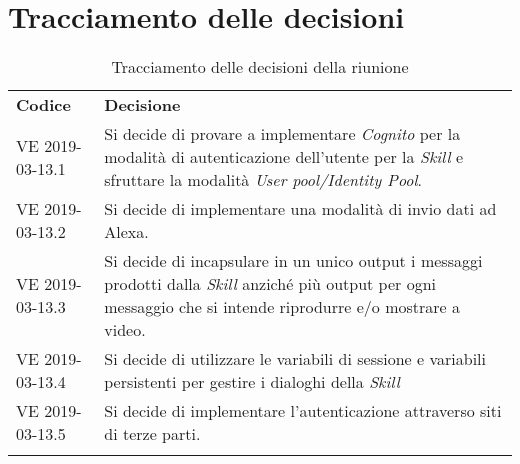 \clearpage
\section{Tracciamento delle decisioni}
\label{sec:tracciamento}
\begin{center}
	\renewcommand{\arraystretch}{1.5}
	\begin{longtable}{  p{2.8cm} p{11.4cm} }
		\rowcolor{tableHeadYellow}
		\textbf{Codice}&\textbf{Decisione}\\
		VE 2019-03-13.1 & Si decide di provare a implementare \textit{Cognito} per la modalità di autenticazione dell'utente per la \textit{Skill} e sfruttare la modalità \textit{User pool/Identity Pool}.\\
		VE 2019-03-13.2 & Si decide di implementare una modalità di invio dati ad Alexa.\\
		VE 2019-03-13.3 & Si decide di incapsulare in un unico output i messaggi prodotti dalla \textit{Skill} anziché più output per ogni messaggio che si intende riprodurre e/o mostrare a video.\\
		VE 2019-03-13.4 & Si decide di utilizzare le variabili di sessione e variabili persistenti per gestire i dialoghi della \textit{Skill}\\
		VE 2019-03-13.5 & Si decide di implementare l'autenticazione attraverso siti di terze parti.\\
		\rowcolor{white}
		\caption{Tracciamento delle decisioni della riunione}
	\end{longtable}	
\end{center}